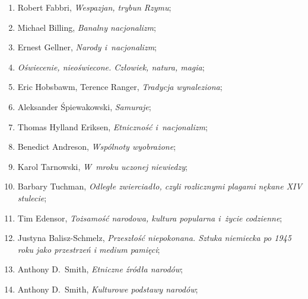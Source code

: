 \documentclass[a4paper,11pt]{article}
\begin{document}
\begin{enumerate}
\item Robert Fabbri, \textit{Wespazjan, trybun Rzymu};



\item Michael Billing, \textit{Banalny nacjonalizm};



\item Ernest Gellner, \textit{Narody i~nacjonalizm};



\item \textit{Oświecenie, nieoświecone. Człowiek, natura, magia};



\item Eric Hobsbawm, Terence Ranger, \textit{Tradycja wynaleziona};



\item Aleksander Śpiewakowski, \textit{Samuraje};



\item Thomas Hylland Eriksen, \textit{Etniczność i~nacjonalizm};



\item Benedict Andreson, \textit{Wspólnoty wyobrażone};



\item Karol Tarnowski, \textit{W~mroku uczonej niewiedzy};



\item Barbary Tuchman, \textit{Odległe zwierciadło, czyli rozlicznymi
    plagami nękane XIV stulecie};



\item Tim Edensor, \textit{Tożsamość narodowa, kultura popularna i~życie
    codzienne};



\item Justyna Balisz-Schmelz, \textit{Przeszłość niepokonana. Sztuka
    niemiecka po 1945 roku jako przestrzeń i medium pamięci};



\item Anthony D.~Smith, \textit{Etniczne źródła narodów};



\item Anthony D.~Smith, \textit{Kulturowe podstawy narodów};




\end{enumerate}
\end{document}
